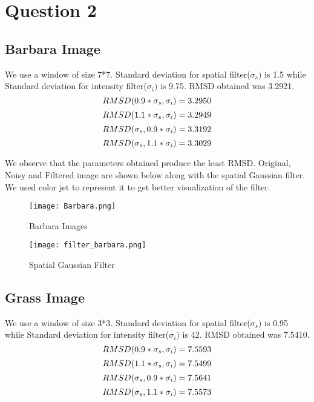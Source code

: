 \documentclass[12pt, a4paper]{article}
\begin{document}
\vspace*{-22pt}
\section*{Question 2}
\subsection*{Barbara Image}
We use a window of size 7*7. Standard deviation for spatial filter($\sigma_s)$ is 1.5 while Standard deviation for intensity filter($\sigma_i)$ is 9.75. RMSD obtained was 3.2921.
\begin{equation*}
    RMSD(0.9*\sigma_s, \sigma_i) = 3.2950\\
\end{equation*}
\begin{equation*}
    RMSD(1.1*\sigma_s, \sigma_i) = 3.2949\\
\end{equation*}
\begin{equation*}
    RMSD(\sigma_s, 0.9*\sigma_i) = 3.3192\\
\end{equation*}
\begin{equation*}
    RMSD(\sigma_s, 1.1*\sigma_i) = 3.3029\\
\end{equation*}

We observe that the parameters obtained produce the least RMSD. Original, Noisy and Filtered image are shown below along with the spatial Gaussian filter. We used color jet to represent it to get better visualization of the filter.
\begin{figure}[h!]
  \centering
    \texttt{[image: Barbara.png]}
    \caption{Barbara Images}
  \label{fig:1}
\end{figure}

\begin{figure}[h!]
  \centering
    \texttt{[image: filter\_barbara.png]}
    \caption{Spatial Gaussian Filter}
  \label{fig:1}
\end{figure}

\subsection*{Grass Image}
We use a window of size 3*3. Standard deviation for spatial filter($\sigma_s)$ is 0.95 while Standard deviation for intensity filter($\sigma_i)$ is 42. RMSD obtained was 7.5410.
\begin{equation*}
    RMSD(0.9*\sigma_s, \sigma_i) = 7.5593\\
\end{equation*}
\begin{equation*}
    RMSD(1.1*\sigma_s, \sigma_i) = 7.5499\\
\end{equation*}
\begin{equation*}
    RMSD(\sigma_s, 0.9*\sigma_i) = 7.5641\\
\end{equation*}
\begin{equation*}
    RMSD(\sigma_s, 1.1*\sigma_i) = 7.5573\\
\end{equation*}
\end{document}
